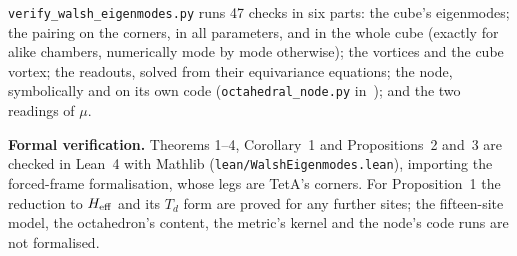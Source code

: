 \documentclass[twocolumn]{iopjournal}
\theoremstyle{definition}
\theoremstyle{remark}
\begin{document}
\texttt{verify\_walsh\_eigenmodes.py} runs 47 checks in six parts: the
cube's eigenmodes; the pairing on the corners, in all parameters, and in
the whole cube (exactly for alike chambers, numerically mode by mode
otherwise); the
vortices and the cube vortex; the readouts, solved from their equivariance
equations; the node, symbolically and on its own code
(\texttt{octahedral\_node.py} in~\cite{NelsonPixelated}); and the two
readings of $\mu$.

\textbf{Formal verification.} Theorems 1--4, Corollary~1 and
Propositions~2 and~3 are checked in Lean~4 with Mathlib
(\texttt{lean/WalshEigenmodes.lean}), importing the forced-frame
formalisation, whose legs are TetA's corners. For Proposition~1 the
reduction to $H_{\rm eff}$ and its $T_d$ form are proved for any further
sites; the fifteen-site model, the octahedron's content, the metric's
kernel and the node's code runs are not formalised.
\end{document}
